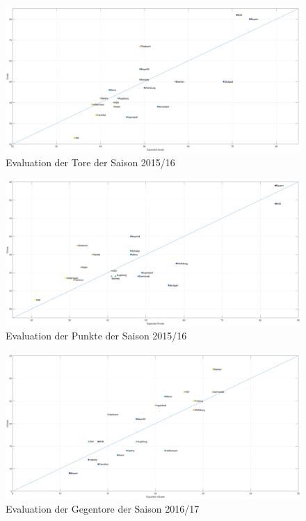 \begin{figure}
\centering
\includegraphics[scale=0.3]{se-wa-jpg/goals_correlation_15_16}
\caption{Evaluation der Tore der Saison 2015/16}
\label{lines}
\end{figure}

\begin{figure}
\centering
\includegraphics[scale=0.3]{se-wa-jpg/points_correlation_15_16}
\caption{Evaluation der Punkte der Saison 2015/16}
\label{lines}
\end{figure}

\begin{figure}
\centering
\includegraphics[scale=0.3]{se-wa-jpg/cGoals_correlation_16_17}
\caption{Evaluation der Gegentore der Saison 2016/17}
\label{lines}
\end{figure}

